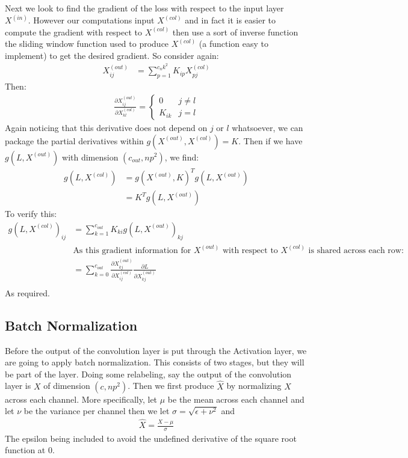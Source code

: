 \documentclass[12pt]{article}
\begin{document}
Next we look to find the gradient of the loss with respect to the input layer $X^{(in)}$.
However our computations input $X^{(col)}$ and in fact it is easier to compute the gradient
with respect to $X^{(col)}$ then use a sort of inverse function the sliding window function
used to produce $X^{(col)}$ (a function easy to implement) to get the desired gradient.
So consider again:
\begin{align*}
    X^{(out)}_{ij} &= \sum_{p = 1}^{c_nk^2}K_{ip}X^{(col)}_{pj}
\end{align*}
Then:
\begin{align*}
    \frac{\partial  X^{(out)}_{ij}}{\partial X^{(col)}_{kl}} = 
    \begin{cases}
        0 & j \neq l \\
        K_{ik} & j = l
    \end{cases}
\end{align*}
Again noticing that this derivative does not depend on $j$ or $l$ whatsoever,
we can package the partial derivatives within $g(X^{(out)}, X^{(col)}) = K$.
Then if we have $g(L, X^{(out)})$ with dimension $(c_{out}, np^2)$, we find:
\begin{align*}
    g(L, X^{(col)}) &=  g(X^{(out)}, K)^Tg(L, X^{(out)}) \\
    &= K^Tg(L, X^{(out)})
\end{align*}
To verify this:
\begin{align*}
    g(L, X^{(col)})_{ij} &= \sum_{k = 1}^{c_{out}}K_{ki}g(L, X^{(out)})_{kj} \\
    &\text{As this gradient information for $X^{(out)}$ with respect to $X^{(col)}$ is shared across each row:} \\
    &= \sum_{k = 0}^{c_{out}}\frac{\partial X^{(out)}_{kj}}{\partial X^{(col)}_{ij}}\frac{\partial L}{\partial X^{(out)}_{kj}}\\
\end{align*}
As required.

\subsection*{Batch Normalization}
Before the output of the convolution layer is put through the Activation
layer, we are going to apply batch normalization. This consists of two stages,
but they will be part of the layer. Doing some relabeling, say the output of the convolution layer
is $X$ of dimension $(c, np^2)$. Then we first produce $\hat{X}$ by normalizing
$X$ across each channel. More specifically, let $\mu$ be the mean across each channel and
let $\nu$ be the variance per channel then we let $\sigma = \sqrt{\epsilon + \nu^2}$ and
\begin{align*}
    \hat{X} = \frac{X - \mu}{\sigma}
\end{align*}
The epsilon being included to avoid the undefined derivative of the square root function
at 0.
\end{document}
